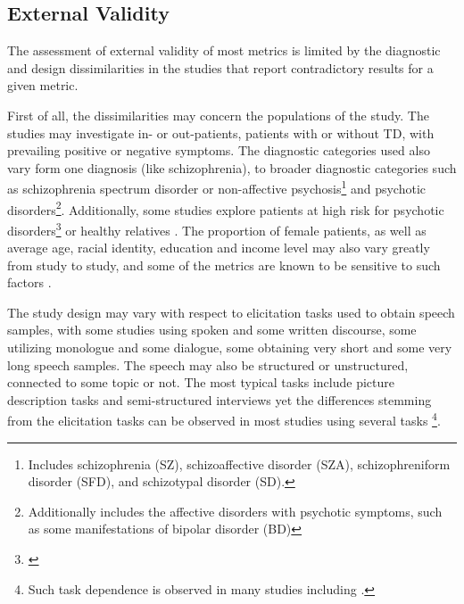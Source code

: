 \subsection{External Validity}
\label{sec:intro:external-validity}

The assessment of external validity of most metrics is limited by the diagnostic and design dissimilarities in the studies that report contradictory results for a given metric. 

First of all, the dissimilarities may concern the populations of the study. The studies may investigate in- or out-patients, patients with or without TD, with prevailing positive or negative symptoms. The diagnostic categories used also vary form one diagnosis (like schizophrenia), to broader diagnostic categories such as schizophrenia spectrum disorder or non-affective psychosis\footnote{Includes schizophrenia (SZ), schizoaffective disorder (SZA), schizophreniform disorder (SFD),  and schizotypal disorder (SD).} and psychotic disorders\footnote{Additionally includes the affective disorders with psychotic symptoms, such as some manifestations of bipolar disorder (BD)}. Additionally, some studies explore patients at high risk for psychotic disorders\footnote{\cite{bedi2015automated, rosenstein2015language, corcoran2018prediction, gupta2018automated, rezaii2019machine, haas2020linking, hitczenko2021understanding, bilgrami2022construct}} or healthy relatives \citep{elvevaag2010automated}. The proportion of female patients, as well as average age, racial identity, education and income level may also vary greatly from study to study, and some of the metrics are known to be sensitive to such factors \citep{hitczenko2021understanding, palaniyappan2021more, minor2023automated}.

The study design may vary with respect to elicitation tasks used to obtain speech samples, with some studies using spoken and some written discourse, some utilizing monologue and some dialogue, some obtaining very short and some very long speech samples. The speech may also be structured or unstructured, connected to some topic or not. The most typical tasks include picture description tasks and semi-structured interviews yet the differences stemming from the elicitation tasks can be observed in most studies using several tasks \footnote{Such task dependence is observed in many studies including \cite{elvevaag2007quantifying, mota2016quantifying, mota2017thought, just2019coherence, ryazanskaya2020thesis}.}.

